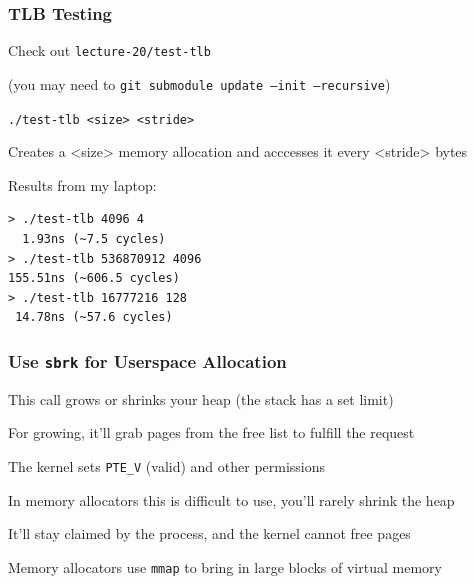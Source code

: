   \begin{frame}[fragile]
    \frametitle{TLB Testing}

    Check out \texttt{lecture-20/test-tlb}

    \hspace{2em} (you may need to \texttt{git submodule update --init --recursive})

    \vspace{2em}

    \texttt{./test-tlb <size> <stride>}

    \hspace{2em} Creates a <size> memory allocation and acccesses it every <stride> bytes

    \vspace{2em}

    Results from my laptop:

    \begin{lstlisting}
> ./test-tlb 4096 4        
  1.93ns (~7.5 cycles)
> ./test-tlb 536870912 4096
155.51ns (~606.5 cycles)
> ./test-tlb 16777216 128  
 14.78ns (~57.6 cycles)
    \end{lstlisting}
  \end{frame}

  \begin{frame}
    \frametitle{Use \texttt{sbrk} for Userspace Allocation}

    This call grows or shrinks your heap (the stack has a set limit)

    \vspace{2em}

    For growing, it'll grab pages from the free list to fulfill the request

    \hspace{2em} The kernel sets \texttt{PTE\_V} (valid) and other permissions

    \vspace{2em}

    In memory allocators this is difficult to use, you'll rarely shrink the heap

    \hspace{2em} It'll stay claimed by the process, and the kernel cannot free
    pages

    \vspace{2em}

    Memory allocators use \texttt{mmap} to bring in large blocks of virtual
    memory
  \end{frame}

